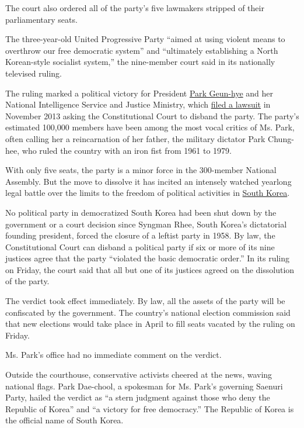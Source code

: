 The court also ordered all of the party's five lawmakers stripped of
their parliamentary seats.

The three-year-old United Progressive Party ``aimed at using violent
means to overthrow our free democratic system'' and ``ultimately
establishing a North Korean-style socialist system,'' the nine-member
court said in its nationally televised ruling.

The ruling marked a political victory for President
\href{http://topics.nytimes.com/top/reference/timestopics/people/p/park_geunhye/index.html}{Park
Geun-hye} and her National Intelligence Service and Justice Ministry,
which
\href{http://www.nytimes.com/2013/11/06/world/asia/south-korean-government-seeks-ban-of-small-leftist-party.html}{filed
a lawsuit} in November 2013 asking the Constitutional Court to disband
the party. The party's estimated 100,000 members have been among the
most vocal critics of Ms. Park, often calling her a reincarnation of her
father, the military dictator Park Chung-hee, who ruled the country with
an iron fist from 1961 to 1979.

With only five seats, the party is a minor force in the 300-member
National Assembly. But the move to dissolve it has incited an intensely
watched yearlong legal battle over the limits to the freedom of
political activities in
\href{http://topics.nytimes.com/top/news/international/countriesandterritories/southkorea/index.html}{South
Korea}.

No political party in democratized South Korea had been shut down by the
government or a court decision since Syngman Rhee, South Korea's
dictatorial founding president, forced the closure of a leftist party in
1958. By law, the Constitutional Court can disband a political party if
six or more of its nine justices agree that the party ``violated the
basic democratic order.'' In its ruling on Friday, the court said that
all but one of its justices agreed on the dissolution of the party.

The verdict took effect immediately. By law, all the assets of the party
will be confiscated by the government. The country's national election
commission said that new elections would take place in April to fill
seats vacated by the ruling on Friday.

Ms. Park's office had no immediate comment on the verdict.

Outside the courthouse, conservative activists cheered at the news,
waving national flags. Park Dae-chool, a spokesman for Ms. Park's
governing Saenuri Party, hailed the verdict as ``a stern judgment
against those who deny the Republic of Korea'' and ``a victory for free
democracy.'' The Republic of Korea is the official name of South Korea.

